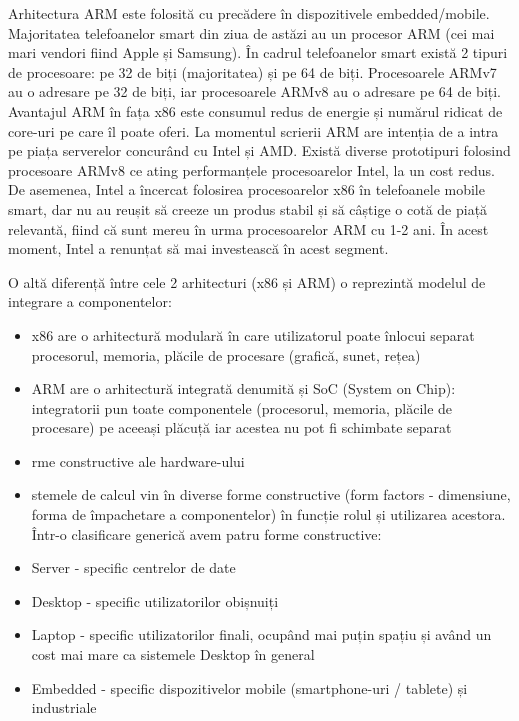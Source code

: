 Arhitectura ARM este folosită cu precădere în dispozitivele embedded/mobile.
Majoritatea telefoanelor smart din ziua de astăzi au un procesor ARM (cei mai
mari vendori fiind Apple și Samsung). În cadrul telefoanelor smart există 2
tipuri de procesoare: pe 32 de biți (majoritatea) și pe 64 de biți. Procesoarele
ARMv7 au o adresare pe 32 de biți, iar procesoarele ARMv8 au o adresare pe 64 de
biți. Avantajul ARM în fața x86 este consumul redus de energie și numărul
ridicat de core-uri pe care îl poate oferi. La momentul scrierii ARM are
intenția de a intra pe piața serverelor concurând cu Intel și AMD. Există
diverse prototipuri folosind procesoare ARMv8 ce ating performanțele
procesoarelor Intel, la un cost redus. De asemenea, Intel a încercat folosirea
procesoarelor x86 în telefoanele mobile smart, dar nu au reușit să creeze un
produs stabil și să câștige o cotă de piață relevantă, fiind că sunt mereu în
urma procesoarelor ARM cu 1-2 ani. În acest moment, Intel a renunțat să mai
investească în acest segment.

O altă diferență între cele 2 arhitecturi (x86 și ARM) o reprezintă modelul de
integrare a componentelor:

\begin{itemize}
	\item x86 are o arhitectură modulară în care utilizatorul poate înlocui separat procesorul, memoria, plăcile de procesare (grafică, sunet, rețea)
	\item ARM are o arhitectură integrată denumită și SoC (System on Chip): integratorii pun toate componentele (procesorul, memoria, plăcile de procesare) pe aceeași plăcuță iar acestea nu pot fi schimbate separat
	\item rme constructive ale hardware-ului
	\item stemele de calcul vin în diverse forme constructive (form factors - dimensiune, forma de împachetare a componentelor) în funcție rolul și utilizarea acestora. Într-o clasificare generică avem patru forme constructive:
	\item Server - specific centrelor de date
	\item Desktop - specific utilizatorilor obișnuiți
	\item Laptop - specific utilizatorilor finali, ocupând mai puțin spațiu și având un cost mai mare ca sistemele Desktop în general
	\item Embedded - specific dispozitivelor mobile (smartphone-uri / tablete) și industriale
\end{itemize}

